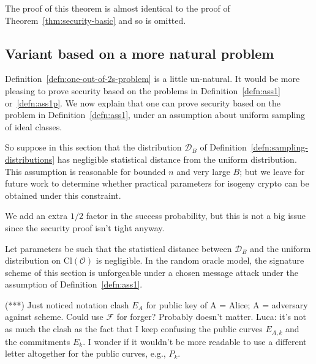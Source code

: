 \documentclass{llncs}
\newcommand{\D}{\mathcal{D}}
\newcommand{\FF}{\mathcal{F}}
\newcommand{\OO}{\mathcal{O}}
\newcommand{\Cl}{\text{Cl}}
\begin{document}
The proof of this theorem is almost identical to the proof of Theorem~\ref{thm:security-basic} and so is omitted.



\subsection{Variant based on a more natural problem}


Definition~\ref{defn:one-out-of-2s-problem}  is a little un-natural.
It would be more pleasing to prove security based on the problems in Definition~\ref{defn:ass1} or~\ref{defn:ass1p}.
We now explain that one can prove security based on the problem in Definition~\ref{defn:ass1}, under an assumption about uniform sampling of ideal classes.

So suppose in this section that the distribution $\D_B$ of Definition~\ref{defn:sampling-distributions} has negligible statistical distance from the uniform distribution.
This assumption is reasonable for bounded $n$ and very large $B$; but we leave for future work to determine whether practical parameters for isogeny crypto can be obtained under this constraint.


We add an extra $1/2$ factor in the success probability, but this is not a big issue since the security proof isn't tight anyway.


\begin{theorem}
Let parameters be such that the statistical distance between $\D_B$ and the uniform distribution on $\Cl(\OO)$ is negligible.
In the random oracle model, the signature scheme of this section is unforgeable under a chosen message attack under the assumption of Definition~\ref{defn:ass1}.
\end{theorem}


(***) Just noticed notation clash $E_A$ for public key of A = Alice; A = adversary against scheme. Could use $\FF$ for forger?  Probably doesn't matter.
%
Luca: it's not as much the clash as the fact that I keep confusing the public curves $E_{A,k}$ and the commitments $E_k$. I wonder if it wouldn't be more readable to use a different letter altogether for the public curves, e.g., $P_k$.
\end{document}
